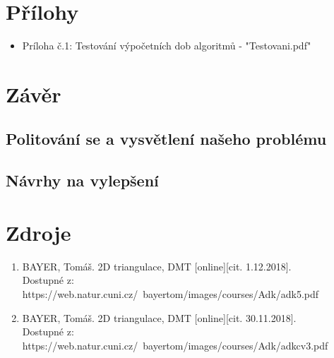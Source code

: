 \documentclass[a4paper, 12pt]{article}
\begin{document}
\clearpage

\section{Přílohy}

\begin{itemize}
	\item Príloha č.1: Testování výpočetních dob algoritmů - "Testovani.pdf"
\end{itemize}
\clearpage
\section{Závěr}

\subsection{Politování se a vysvětlení našeho problému}

\subsection{Návrhy na vylepšení}


\clearpage
\section{Zdroje}

\begin{enumerate}
\item  BAYER, Tomáš. 2D triangulace, DMT [online][cit. 1.12.2018]. \\
Dostupné z: https://web.natur.cuni.cz/~bayertom/images/courses/Adk/adk5.pdf  \\

\item  BAYER, Tomáš. 2D triangulace, DMT [online][cit. 30.11.2018]. \\
Dostupné z: https://web.natur.cuni.cz/~bayertom/images/courses/Adk/adkcv3.pdf\\
\end{enumerate}
\end{document}
